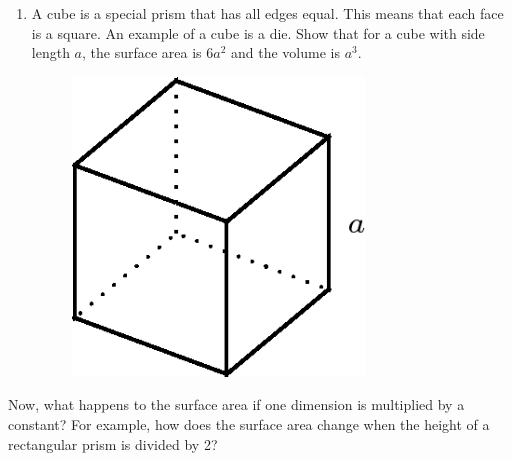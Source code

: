 \begin{enumerate}[noitemsep, label=\textbf{\arabic*}. ]
    \addtocounter{footnote}{-0}
            \label{m39357*uid19}\item A cube is a special prism that has all edges equal. This means that each face is a square. An example of a cube is a die. Show that for a cube with side length $a$, the surface area is \begin{math}6{a}^{2}\end{math} and the volume is \begin{math}{a}^{3}\end{math}.

    \setcounter{subfigure}{0}


	\begin{figure}[H] %
    \begin{center}
    \label{m39357*id63117!!!underscore!!!media}\label{m39357*id63117!!!underscore!!!printimage}\includegraphics[height=300px]{col11306.imgs/m39357_MG10C14_007.png} %
        
      \vspace{2pt}
    \vspace{.1in}
    
    \end{center}

 \end{figure}   

    \addtocounter{footnote}{-0}
            \end{enumerate}
        
        

        \label{m39357*id63133}Now, what happens to the surface area if one dimension is multiplied by a constant? For example, how does the surface area change when the height of a rectangular prism is divided by 2?\par 
 \label{m39357*is08324}       
    \setcounter{subfigure}{0}


